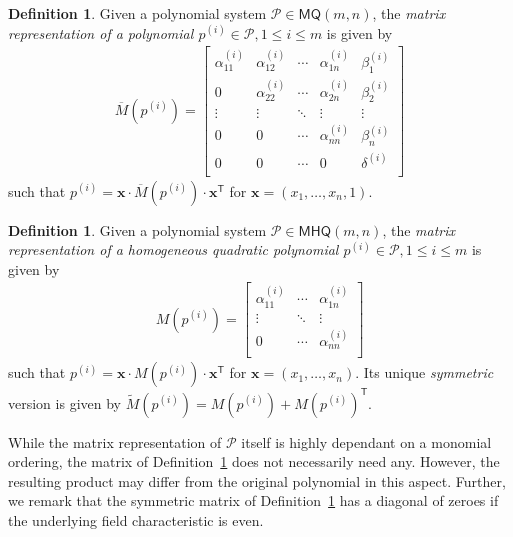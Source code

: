 \documentclass[draft, 12pt, a4paper, oneside]{memoir}
\theoremstyle{definition}
\newtheorem{definition}[theorem]{Definition}
\begin{document}
\begin{definition}\label{def:matquad}
  Given a polynomial system $\mathcal{P} \in \textsf{MQ}(m, n)$, the \emph{matrix representation of a polynomial $p^{(i)} \in \mathcal{P}, 1 \leq i \leq m$} is given by
  \begin{align}
    \overline{M}(p^{(i)}) = 
    \begin{bmatrix}
      \alpha^{(i)}_{11} & \alpha^{(i)}_{12} & \cdots & \alpha^{(i)}_{1n} & \beta^{(i)}_{1}  \\
                      0 & \alpha^{(i)}_{22} & \cdots & \alpha^{(i)}_{2n} & \beta^{(i)}_{2}  \\
                 \vdots &            \vdots & \ddots &            \vdots & \vdots           \\
                      0 &                 0 & \cdots & \alpha^{(i)}_{nn} & \beta^{(i)}_{n}  \\
                      0 &                 0 & \cdots &                 0 & \delta^{(i)}     \\
    \end{bmatrix}
  \end{align}
  such that $p^{(i)} = \mathbf{x} \cdot \overline{M}(p^{(i)}) \cdot \mathbf{x}^{\textsf{T}}$ for $\mathbf{x} = (x_{1}, \dots, x_{n}, 1)$.
\end{definition}

\begin{definition}\label{def:mathom}
  Given a polynomial system $\mathcal{P} \in \textsf{MHQ}(m, n)$, the \emph{matrix representation of a homogeneous quadratic polynomial $p^{(i)} \in \mathcal{P}, 1 \leq i \leq m$} is given by
  \begin{align}
    M(p^{(i)}) = 
    \begin{bmatrix}
      \alpha^{(i)}_{11} & \cdots & \alpha^{(i)}_{1n}    \\
                 \vdots & \ddots &            \vdots    \\
                      0 & \cdots & \alpha^{(i)}_{nn}    \\
    \end{bmatrix}
  \end{align}
  such that $p^{(i)} = \mathbf{x} \cdot M(p^{(i)}) \cdot \mathbf{x}^{\textsf{T}}$ for $\mathbf{x} = (x_{1}, \dots, x_{n})$. Its unique \emph{symmetric} version is given by $\widetilde{M}(p^{(i)}) = M(p^{(i)}) + M(p^{(i)})^{\mathsf{T}}$.
\end{definition}

While the matrix representation of $\mathcal{P}$ itself is highly dependant on a monomial ordering, the matrix of Definition~\ref{def:matquad} does not necessarily need any. However, the resulting product may differ from the original polynomial in this aspect. Further, we remark that the symmetric matrix of Definition~\ref{def:mathom} has a diagonal of zeroes if the underlying field characteristic is even. 
\end{document}

